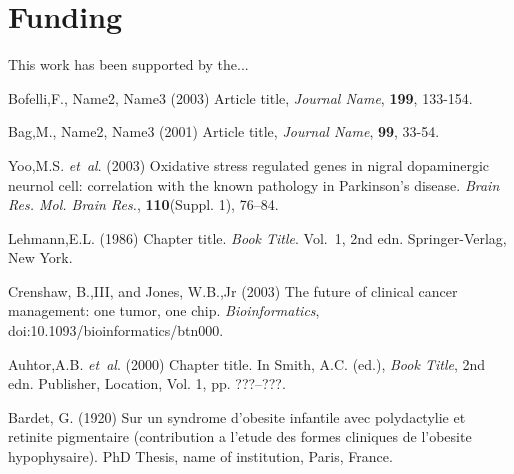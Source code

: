 \documentclass{bioinfo}
\begin{document}
\section*{Funding}

This work has been supported by the... \vspace*{-12pt}

%
%
%
%
%
%
%
%
%


\begin{thebibliography}{}

Bofelli,F., Name2, Name3 (2003) Article title, {\it Journal Name}, {\bf 199}, 133-154.

Bag,M., Name2, Name3 (2001) Article title, {\it Journal Name}, {\bf 99}, 33-54.

Yoo,M.S. \textit{et~al}. (2003) Oxidative stress regulated genes
in nigral dopaminergic neurnol cell: correlation with the known
pathology in Parkinson's disease. \textit{Brain Res. Mol. Brain
Res.}, \textbf{110}(Suppl. 1), 76--84.

Lehmann,E.L. (1986) Chapter title. \textit{Book Title}. Vol.~1, 2nd edn. Springer-Verlag, New York.

Crenshaw, B.,III, and Jones, W.B.,Jr (2003) The future of clinical
cancer management: one tumor, one chip. \textit{Bioinformatics},
doi:10.1093/bioinformatics/btn000.

Auhtor,A.B. \textit{et~al}. (2000) Chapter title. In Smith, A.C.
(ed.), \textit{Book Title}, 2nd edn. Publisher, Location, Vol. 1, pp.
???--???.

Bardet, G. (1920) Sur un syndrome d'obesite infantile avec
polydactylie et retinite pigmentaire (contribution a l'etude des
formes cliniques de l'obesite hypophysaire). PhD Thesis, name of
institution, Paris, France.

\end{thebibliography}
\end{document}
